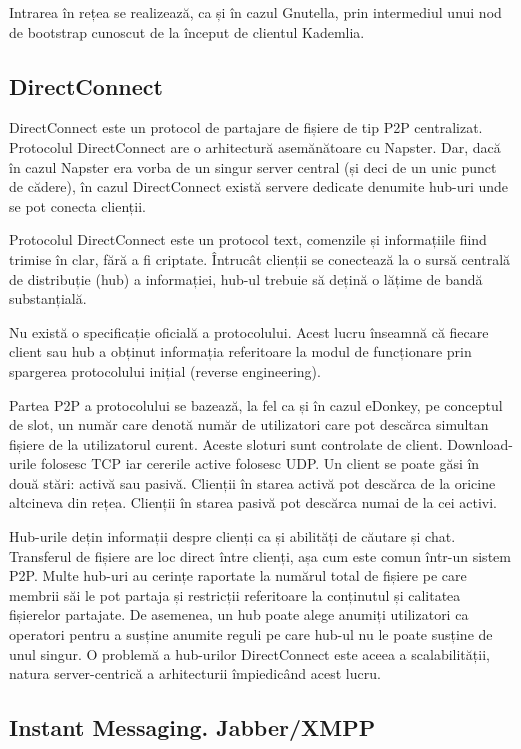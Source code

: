 Intrarea în rețea se realizează, ca și în cazul Gnutella, prin intermediul
unui nod de bootstrap cunoscut de la început de clientul Kademlia.

\subsection{DirectConnect}

DirectConnect este un protocol de partajare de fișiere de tip P2P centralizat.
Protocolul DirectConnect are o arhitectură asemănătoare cu Napster. Dar, dacă
în cazul Napster era vorba de un singur server central (și deci de un unic
punct de cădere), în cazul DirectConnect există servere dedicate denumite
hub-uri unde se pot conecta clienții.

Protocolul DirectConnect este un protocol text, comenzile și informațiile
fiind trimise în clar, fără a fi criptate. Întrucât clienții se conectează la
o sursă centrală de distribuție (hub) a informației, hub-ul trebuie să dețină
o lățime de bandă substanțială.

Nu există o specificație oficială a protocolului. Acest lucru înseamnă că
fiecare client sau hub a obținut informația referitoare la modul de
funcționare prin spargerea protocolului inițial (reverse engineering).

Partea P2P a protocolului se bazează, la fel ca și în cazul eDonkey, pe
conceptul de slot, un număr care denotă număr de utilizatori care pot descărca
simultan fișiere de la utilizatorul curent. Aceste sloturi sunt controlate de
client. Download-urile folosesc TCP iar cererile active folosesc UDP. Un
client se poate găsi în două stări: activă sau pasivă. Clienții în starea
activă pot descărca de la oricine altcineva din rețea. Clienții în starea
pasivă pot descărca numai de la cei activi.

Hub-urile dețin informații despre clienți ca și abilități de căutare și chat.
Transferul de fișiere are loc direct între clienți, așa cum este comun într-un
sistem P2P. Multe hub-uri au cerințe raportate la numărul total de fișiere pe
care membrii săi le pot partaja și restricții referitoare la conținutul și
calitatea fișierelor partajate. De asemenea, un hub poate alege anumiți
utilizatori ca operatori pentru a susține anumite reguli pe care hub-ul nu le
poate susține de unul singur. O problemă a hub-urilor DirectConnect este aceea
a scalabilității, natura server-centrică a arhitecturii împiedicând acest
lucru.

\subsection{Instant Messaging. Jabber/XMPP}

